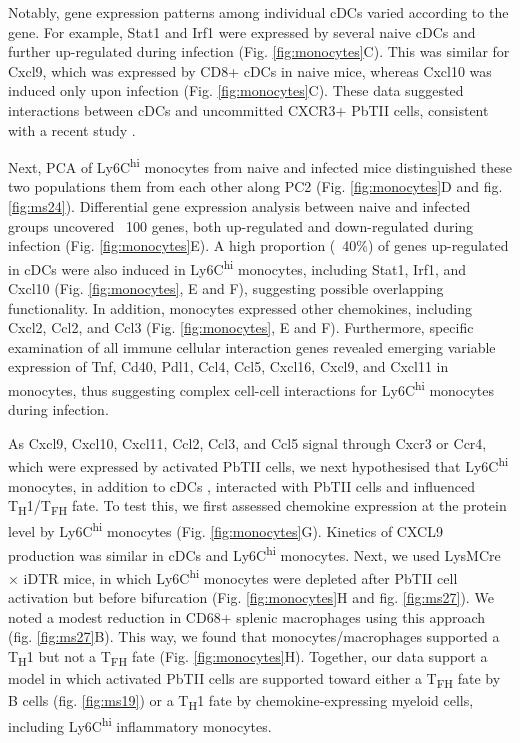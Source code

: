 Notably, gene expression patterns among individual cDCs varied according to the gene. For example, Stat1 and Irf1 were expressed by several naive cDCs and further up-regulated during infection (Fig. \ref{fig:monocytes}C). This was similar for Cxcl9, which was expressed by CD8+ cDCs in naive mice, whereas Cxcl10 was induced only upon infection (Fig. \ref{fig:monocytes}C). These data suggested interactions between cDCs and uncommitted CXCR3+ PbTII cells, consistent with a recent study \cite{Groom2012-az}.

Next, PCA of Ly6C\textsuperscript{hi} monocytes from naive and infected mice distinguished these two populations them from each other along PC2 (Fig. \ref{fig:monocytes}D and fig. \ref{fig:ms24}). Differential gene expression analysis between naive and infected groups uncovered ~100 genes, both up-regulated and down-regulated during infection (Fig. \ref{fig:monocytes}E). A high proportion (~40\%) of genes up-regulated in cDCs were also induced in Ly6C\textsuperscript{hi} monocytes, including Stat1, Irf1, and Cxcl10 (Fig. \ref{fig:monocytes}, E and F), suggesting possible overlapping functionality. In addition, monocytes expressed other chemokines, including Cxcl2, Ccl2, and Ccl3 (Fig. \ref{fig:monocytes}, E and F). Furthermore, specific examination of all immune cellular interaction genes revealed emerging variable expression of Tnf, Cd40, Pdl1, Ccl4, Ccl5, Cxcl16, Cxcl9, and Cxcl11 in monocytes, thus suggesting complex cell-cell interactions for Ly6C\textsuperscript{hi} monocytes during infection.

As Cxcl9, Cxcl10, Cxcl11, Ccl2, Ccl3, and Ccl5 signal through Cxcr3 or Ccr4, which were expressed by activated PbTII cells, we next hypothesised that Ly6C\textsuperscript{hi} monocytes, in addition to cDCs \cite{Groom2012-az}, interacted with PbTII cells and influenced T\textsubscript{H}1/T\textsubscript{FH} fate. To test this, we first assessed chemokine expression at the protein level by Ly6C\textsuperscript{hi} monocytes (Fig. \ref{fig:monocytes}G). Kinetics of CXCL9 production was similar in cDCs and Ly6C\textsuperscript{hi} monocytes. Next, we used LysMCre × iDTR mice, in which Ly6C\textsuperscript{hi} monocytes were depleted after PbTII cell activation but before bifurcation (Fig. \ref{fig:monocytes}H and fig. \ref{fig:ms27}). We noted a modest reduction in CD68+ splenic macrophages using this approach (fig. \ref{fig:ms27}B). This way, we found that monocytes/macrophages supported a T\textsubscript{H}1 but not a T\textsubscript{FH} fate (Fig. \ref{fig:monocytes}H). Together, our data support a model in which activated PbTII cells are supported toward either a T\textsubscript{FH} fate by B cells (fig. \ref{fig:ms19}) or a T\textsubscript{H}1 fate by chemokine-expressing myeloid cells, including Ly6C\textsuperscript{hi} inflammatory monocytes.

